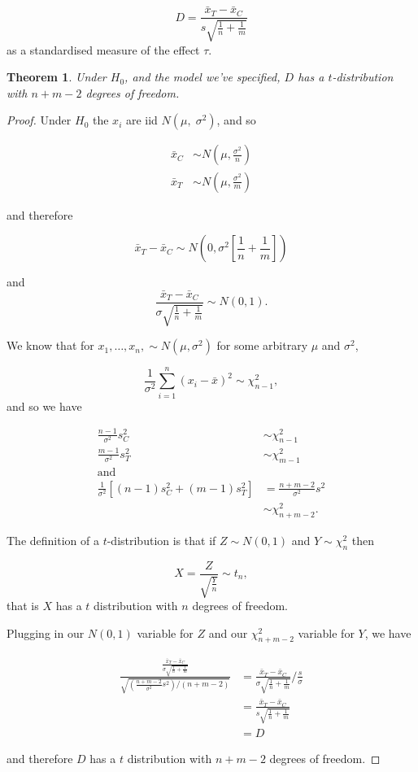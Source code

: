 \documentclass[
  openany]{book}
\newtheorem{theorem}{Theorem}[chapter]
\theoremstyle{definition}
\theoremstyle{definition}
\theoremstyle{definition}
\theoremstyle{definition}
\theoremstyle{remark}
\begin{document}
\[D = \frac{\bar{x}_T - \bar{x}_C}{s\sqrt{\frac{1}{n} + \frac{1}{m}}}\]
as a standardised measure of the effect \(\tau\).

\begin{theorem}
Under \(H_0\), and the model we've specified, \(D\) has a \(t\)-distribution with \(n+m-2\) degrees of freedom.
\end{theorem}

\begin{proof}
Under \(H_0\) the \(x_i\) are iid \(N\left(\mu,\;\sigma^2\right)\), and so

\begin{align*}
\bar{x}_C & \sim{N\left(\mu, \frac{\sigma^2}{n}\right)}\\
\bar{x}_T & \sim{N\left(\mu, \frac{\sigma^2}{m}\right)}
\end{align*}

and therefore

\[
\bar{x}_T - \bar{x}_C \sim{N \left(0, \sigma^2\left[\frac{1}{n} + \frac{1}{m}\right] \right)}\]

and
\[
\frac{\bar{x}_T - \bar{x}_C}{\sigma \sqrt{\frac{1}{n}+\frac{1}{m}}} \sim{N\left(0,1\right)}.\]

We know that for \(x_1,\ldots,x_n,\sim N\left(\mu,\sigma^2\right)\) for some arbitrary \(\mu\) and \(\sigma^2\),

\[\frac{1}{\sigma^2}\sum\limits_{i=1}^n\left(x_i - \bar{x}\right)^2 \sim{\chi^2_{n-1}},\]
and so we have

\begin{align*}
\frac{n-1}{\sigma^2}s_C^2 & \sim \chi^2_{n-1}\\
\frac{m-1}{\sigma^2}s_T^2 & \sim \chi^2_{m-1}\\
\text{and} &\\
\frac{1}{\sigma^2}\left[\left(n-1\right)s_C^2 + \left(m-1\right)s_T^2\right] & = \frac{n+m-2}{\sigma^2}s^2\\
&\sim \chi^2_{n+m-2}.
\end{align*}

The definition of a \(t\)-distribution is that if \(Z\sim N\left(0,1\right)\) and \(Y \sim{\chi^2_n}\) then

\[X = \frac{Z} {\sqrt{\frac{Y}{n}}} \sim{t_n},\]
that is \(X\) has a \(t\) distribution with \(n\) degrees of freedom.

Plugging in our \(N\left(0,1\right)\) variable for \(Z\) and our \(\chi^2_{n+m-2}\) variable for \(Y\), we have

\begin{align*}
\frac{\frac{\bar{x}_T - \bar{x}_C}{\sigma\sqrt{\frac{1}{n} + \frac{1}{m}}}}{\sqrt{\left(\frac{n+m-2}{\sigma^2}s^2\right) \bigg/ \left(n+m-2\right)}} & = \frac{\bar{x}_T - \bar{x}_C}{\sigma\sqrt{\frac{1}{n} + \frac{1}{m}}} \bigg/ \frac{s}{\sigma} \\
& = \frac{\bar{x}_T - \bar{x}_C}{s\sqrt{\frac{1}{n} + \frac{1}{m}}} \\
& = D
\end{align*}

and therefore \(D\) has a \(t\) distribution with \(n+m-2\) degrees of freedom.
\end{proof}
\end{document}

